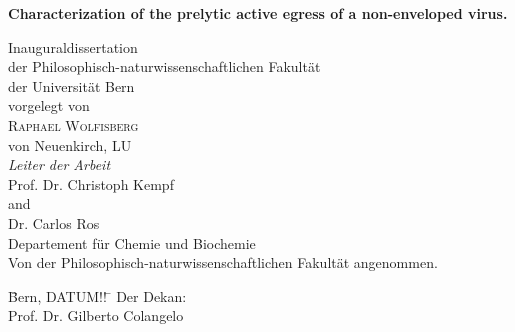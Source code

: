 \documentclass[11pt, titlepage, a4paper, twoside, onecolumn, DIV=calc]{scrbook} %
\begin{document}
\begin{titlepage}
\vspace{-1cm}
\begin{flushright}
\end{flushright}
\begin{center}
\begin{spacing}{2.5}
{\Huge \bfseries Characterization of the prelytic active egress of a non-enveloped virus.} \\[1 cm]
\end{spacing}
{\Large Inauguraldissertation \\
der Philosophisch-naturwissenschaftlichen Fakultät \\
der Universität Bern \\[1.3 cm]
{\large vorgelegt von}\\[0.3 cm]
{\LARGE \textsc{Raphael Wolfisberg}} \\[0.3 cm] 
{\large von Neuenkirch, LU} \\ [1.3 cm]
{\Large \emph{Leiter der Arbeit}\\ [0.3 cm]
{\textsc Prof. Dr. Christoph Kempf} \\
and \\
{\textsc Dr. Carlos Ros} \\ [0.9 cm]
Departement für Chemie und Biochemie} \\[0.8cm]
Von der Philosophisch-naturwissenschaftlichen Fakultät angenommen.} \\[1cm]
\end{center}
\begin{tabbing}

\= Bern, DATUM!! \= \hspace{5.5cm} Der Dekan: \\[1.5cm]
\> \> \hspace{5.5cm} Prof. Dr. Gilberto Colangelo
\end{tabbing}
\end{titlepage}










\cleardoublepage

\setcounter{page}{1}





\frontmatter %
\thispagestyle{plain} 
\end{document}
